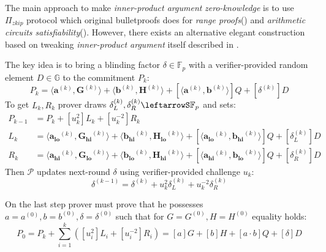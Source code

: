 \documentclass[../lecture-notes-148x210.tex]{subfiles}
\begin{document}
The main approach to make \textit{inner-product argument} \textit{zero-knowledge} is to use $\Pi_{zkip}$ protocol which original bulletproofs \cite{bulletproofs} does for \textit{range proofs}() and \textit{arithmetic circuits satisfiability}(). However, there exists an alternative elegant construction based on tweaking \textit{inner-product argument} itself described in \cite[Appendix E.2]{pvss}. 

The key idea is to bring a blinding factor $\delta \in \mathbb{F}_p$ with a verifier-provided random element $D \in \mathbb{G}$ to the commitment $P_k$:
$$ P_k = \langle \mathbf{a}^{(k)}, \mathbf{G}^{(k)} \rangle + \langle \mathbf{b}^{(k)}, \mathbf{H}^{(k)} \rangle + [\langle \mathbf{a}^{(k)}, \mathbf{b}^{(k)} \rangle]Q + [\delta^{(k)}]D $$
To get $L_k, R_k$ prover draws $\delta^{(k)}_L, \delta^{(k)}_R \leftarrowS \mathbb{F}_p$ and sets:
\begin{align*}
    P_{k-1} &= P_k + [u_k^2] L_k + [u_k^{-2}] R_k \\
    L_{k} &= \langle \mathbf{a_{lo}}^{(k)}, \mathbf{G_{hi}}^{(k)}\rangle + \langle \mathbf{b_{hi}}^{(k)}, \mathbf{H_{lo}}^{(k)}\rangle + [\langle \mathbf{a_{lo}}^{(k)}, \mathbf{b_{hi}}^{(k)}\rangle]Q + [\delta^{(k)}_L]D \\
    R_{k} &= \langle \mathbf{a_{hi}}^{(k)}, \mathbf{G_{lo}}^{(k)}\rangle + \langle \mathbf{b_{lo}}^{(k)}, \mathbf{H_{hi}}^{(k)}\rangle + [\langle \mathbf{a_{hi}}^{(k)}, \mathbf{b_{lo}}^{(k)}\rangle]Q + [\delta^{(k)}_R]D
\end{align*}
Then $\mathcal{P}$ updates next-round $\delta$ using verifier-provided challenge $u_k$: 
$$\delta^{(k-1)} = \delta^{(k)} + u_k^2\delta^{(k)}_L + u_k^{-2}\delta^{(k)}_R$$

On the last step prover must prove that he possesses $a = a^{(0)}, b = b^{(0)}, \delta = \delta^{(0)}$ such that for $G = G^{(0)}, H = H^{(0)}$ equality holds:
\begin{equation*}
    P_0 = P_k + \sum_{i=1}^k ([u_i^2]L_i + [u_i^{-2}]R_i) = [a]G + [b]H + [a\cdot b]Q + [\delta]D
\end{equation*}
\end{document}
